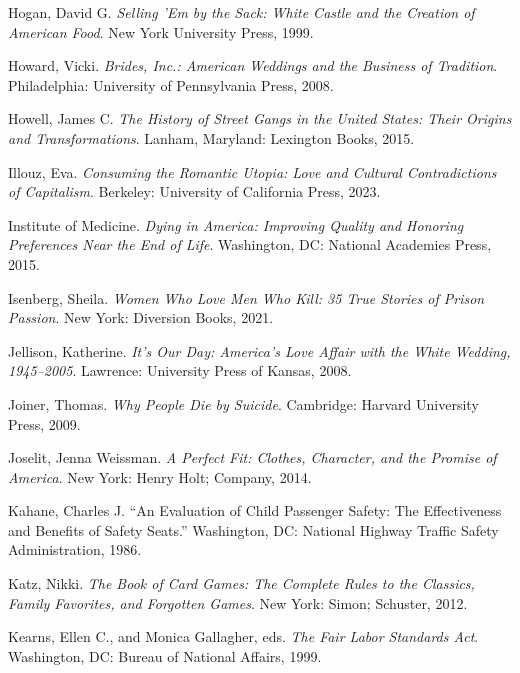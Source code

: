 \documentclass[
  letterpaper,
]{book}
\newlength{\cslhangindent}
\newenvironment{CSLReferences}[2] %
 {\begin{list}{}{%
  \setlength{\itemindent}{0pt}
  \setlength{\leftmargin}{0pt}
  \setlength{\parsep}{0pt}
  \ifodd #1
   \setlength{\leftmargin}{\cslhangindent}
   \setlength{\itemindent}{-1\cslhangindent}
  \fi
  \setlength{\itemsep}{#2\baselineskip}}}
 {\end{list}}
\begin{document}
\begin{CSLReferences}{1}{0}
Hogan, David G. \emph{Selling 'Em by the Sack: White Castle and the
Creation of American Food}. New York University Press, 1999.

Howard, Vicki. \emph{Brides, Inc.: American Weddings and the Business of
Tradition}. Philadelphia: University of Pennsylvania Press, 2008.

Howell, James C. \emph{The History of Street Gangs in the United States:
Their Origins and Transformations}. Lanham, Maryland: Lexington Books,
2015.

Illouz, Eva. \emph{Consuming the Romantic Utopia: Love and Cultural
Contradictions of Capitalism}. Berkeley: University of California Press,
2023.

Institute of Medicine. \emph{Dying in America: Improving Quality and
Honoring Preferences Near the End of Life}. Washington, DC: National
Academies Press, 2015.

Isenberg, Sheila. \emph{Women Who Love Men Who Kill: 35 True Stories of
Prison Passion}. New York: Diversion Books, 2021.

Jellison, Katherine. \emph{It's Our Day: America's Love Affair with the
White Wedding, 1945--2005}. Lawrence: University Press of Kansas, 2008.

Joiner, Thomas. \emph{Why People Die by Suicide}. Cambridge: Harvard
University Press, 2009.

Joselit, Jenna Weissman. \emph{A Perfect Fit: Clothes, Character, and
the Promise of America}. New York: Henry Holt; Company, 2014.

Kahane, Charles J. {``An Evaluation of Child Passenger Safety: The
Effectiveness and Benefits of Safety Seats.''} Washington, DC: National
Highway Traffic Safety Administration, 1986.

Katz, Nikki. \emph{The Book of Card Games: The Complete Rules to the
Classics, Family Favorites, and Forgotten Games}. New York: Simon;
Schuster, 2012.

Kearns, Ellen C., and Monica Gallagher, eds. \emph{The Fair Labor
Standards Act}. Washington, DC: Bureau of National Affairs, 1999.


\end{CSLReferences}
\end{document}
